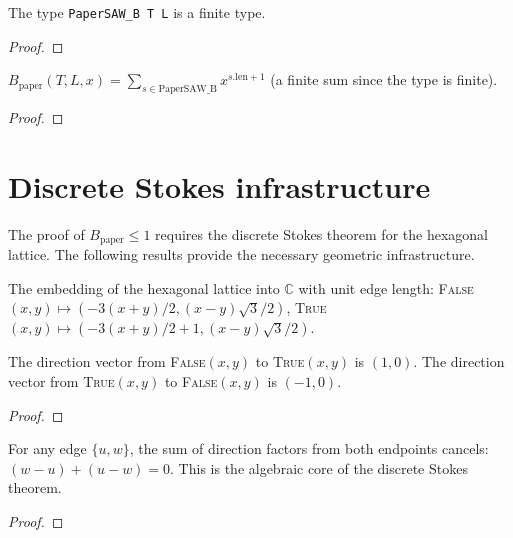 \begin{lemma}\label{lem:paper_saw_b_finite}
\leanok
{}
  The type \texttt{PaperSAW\_B T L} is a finite type.
\end{lemma}
\begin{proof}
\leanok
\end{proof}

\begin{lemma}\label{lem:B_paper_finsum}
\leanok
{}
  $B_{\text{paper}}(T, L, x) = \sum_{s \in \text{PaperSAW\_B}} x^{s.\text{len}+1}$
  (a finite sum since the type is finite).
\end{lemma}
\begin{proof}
\leanok
\end{proof}


\section{Discrete Stokes infrastructure}

The proof of $B_{\text{paper}} \leq 1$ requires the discrete Stokes theorem
for the hexagonal lattice. The following results provide the necessary
geometric infrastructure.

\begin{definition}\label{def:hex_embed}
\leanok
{}
  The embedding of the hexagonal lattice into $\mathbb{C}$ with unit edge length:
  \textsc{False}$(x,y) \mapsto (-3(x+y)/2, (x-y)\sqrt{3}/2)$,
  \textsc{True}$(x,y) \mapsto (-3(x+y)/2 + 1, (x-y)\sqrt{3}/2)$.
\end{definition}

\begin{lemma}\label{lem:hex_dirs}
\leanok
{}
  The direction vector from \textsc{False}$(x,y)$ to \textsc{True}$(x,y)$ is $(1,0)$.
  The direction vector from \textsc{True}$(x,y)$ to \textsc{False}$(x,y)$ is $(-1,0)$.
\end{lemma}
\begin{proof}
\leanok
\end{proof}

\begin{theorem}\label{thm:interior_cancel}
\leanok
{}
  For any edge $\{u, w\}$, the sum of direction factors from both endpoints
  cancels: $(w - u) + (u - w) = 0$. This is the algebraic core of the
  discrete Stokes theorem.
\end{theorem}
\begin{proof}
\leanok
\end{proof}

